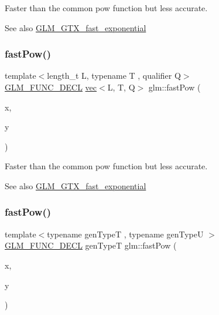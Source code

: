 Faster than the common pow function but less accurate. \begin{DoxySeeAlso}{See also}
\mbox{\hyperlink{group__gtx__fast__exponential}{G\+L\+M\+\_\+\+G\+T\+X\+\_\+fast\+\_\+exponential}} 
\end{DoxySeeAlso}
\mbox{\label{group__gtx__fast__exponential_ga15325a8ed2d1c4ed2412c4b3b3927aa2}} 
\subsubsection{\texorpdfstring{fast\+Pow()}{fastPow()}\hspace{0.1cm}{\footnotesize\ttfamily [2/4]}}
{\footnotesize\ttfamily template$<$length\+\_\+t L, typename T , qualifier Q$>$ \\
\mbox{\hyperlink{setup_8hpp_ab2d052de21a70539923e9bcbf6e83a51}{G\+L\+M\+\_\+\+F\+U\+N\+C\+\_\+\+D\+E\+CL}} \mbox{\hyperlink{structglm_1_1vec}{vec}}$<$L, T, Q$>$ glm\+::fast\+Pow (\begin{DoxyParamCaption}\item[{\mbox{\hyperlink{structglm_1_1vec}{vec}}$<$ L, T, Q $>$ const \&}]{x,  }\item[{\mbox{\hyperlink{structglm_1_1vec}{vec}}$<$ L, T, Q $>$ const \&}]{y }\end{DoxyParamCaption})}

Faster than the common pow function but less accurate. \begin{DoxySeeAlso}{See also}
\mbox{\hyperlink{group__gtx__fast__exponential}{G\+L\+M\+\_\+\+G\+T\+X\+\_\+fast\+\_\+exponential}} 
\end{DoxySeeAlso}
\mbox{\label{group__gtx__fast__exponential_ga7f2562db9c3e02ae76169c36b086c3f6}} 
\subsubsection{\texorpdfstring{fast\+Pow()}{fastPow()}\hspace{0.1cm}{\footnotesize\ttfamily [3/4]}}
{\footnotesize\ttfamily template$<$typename gen\+TypeT , typename gen\+TypeU $>$ \\
\mbox{\hyperlink{setup_8hpp_ab2d052de21a70539923e9bcbf6e83a51}{G\+L\+M\+\_\+\+F\+U\+N\+C\+\_\+\+D\+E\+CL}} gen\+TypeT glm\+::fast\+Pow (\begin{DoxyParamCaption}\item[{gen\+TypeT}]{x,  }\item[{gen\+TypeU}]{y }\end{DoxyParamCaption})}

